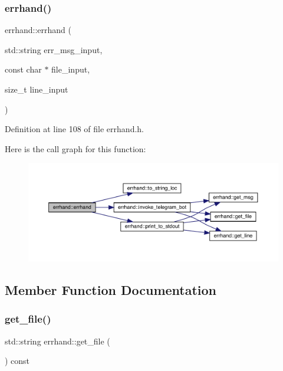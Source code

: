 \subsubsection{\texorpdfstring{errhand()}{errhand()}}
{\footnotesize\ttfamily errhand\+::errhand (\begin{DoxyParamCaption}\item[{std\+::string}]{err\+\_\+msg\+\_\+input,  }\item[{const char $\ast$}]{file\+\_\+input,  }\item[{size\+\_\+t}]{line\+\_\+input }\end{DoxyParamCaption})\hspace{0.3cm}{\ttfamily [inline]}}



Definition at line 108 of file errhand.\+h.

Here is the call graph for this function\+:\nopagebreak
\begin{figure}[H]
\begin{center}
\leavevmode
\includegraphics[width=350pt]{classerrhand_a69afd61e0ebf5ee9d35f297dc2d5c086_cgraph}
\end{center}
\end{figure}


\subsection{Member Function Documentation}
\mbox{\label{classerrhand_a1556ee8d0aaefeea3bbab73f7ae50914}} 
\subsubsection{\texorpdfstring{get\+\_\+file()}{get\_file()}}
{\footnotesize\ttfamily std\+::string errhand\+::get\+\_\+file (\begin{DoxyParamCaption}{ }\end{DoxyParamCaption}) const\hspace{0.3cm}{\ttfamily [inline]}}



